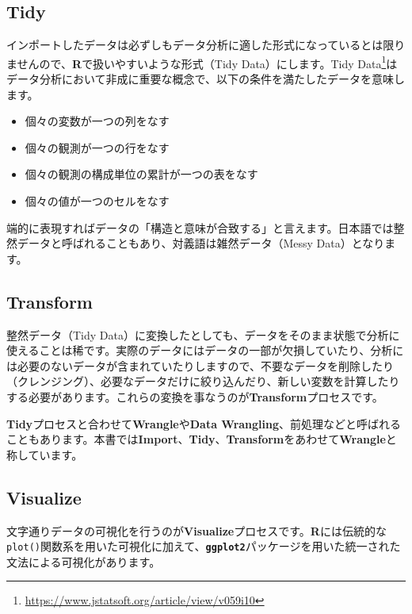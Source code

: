 \documentclass[
  12pt,
]{book}
\DeclareRobustCommand{\href}[2]{#2\footnote{\url{#1}}}
\providecommand{\tightlist}{%
  \setlength{\itemsep}{0pt}\setlength{\parskip}{0pt}}
\begin{document}
\hypertarget{tidy}{%
\subsection*{Tidy}\label{tidy}}

インポートしたデータは必ずしもデータ分析に適した形式になっているとは限りませんので、\textbf{R}で扱いやすいような形式（Tidy Data）にします。\href{https://www.jstatsoft.org/article/view/v059i10}{Tidy Data}\citep{R-TidyData}はデータ分析において非成に重要な概念で、以下の条件を満たしたデータを意味します。

\begin{itemize}
\tightlist
\item
  個々の変数が一つの列をなす
\item
  個々の観測が一つの行をなす
\item
  個々の観測の構成単位の累計が一つの表をなす
\item
  個々の値が一つのセルをなす
\end{itemize}

端的に表現すればデータの「構造と意味が合致する」と言えます。日本語では整然データと呼ばれることもあり、対義語は雑然データ（Messy Data）となります。

\hypertarget{transform}{%
\subsection*{Transform}\label{transform}}

整然データ（Tidy Data）に変換したとしても、データをそのまま状態で分析に使えることは稀です。実際のデータにはデータの一部が欠損していたり、分析には必要のないデータが含まれていたりしますので、不要なデータを削除したり（クレンジング）、必要なデータだけに絞り込んだり、新しい変数を計算したりする必要があります。これらの変換を事なうのが\textbf{Transform}プロセスです。

\textbf{Tidy}プロセスと合わせて\textbf{Wrangle}や\textbf{Data Wrangling}、前処理などと呼ばれることもあります。本書では\textbf{Import}、\textbf{Tidy}、\textbf{Transform}をあわせて\textbf{Wrangle}と称しています。

\hypertarget{visualize}{%
\subsection*{Visualize}\label{visualize}}

文字通りデータの可視化を行うのが\textbf{Visualize}プロセスです。\textbf{R}には伝統的な\texttt{plot()}関数系を用いた可視化に加えて、\textbf{\texttt{ggplot2}}パッケージを用いた統一された文法による可視化があります。
\end{document}
